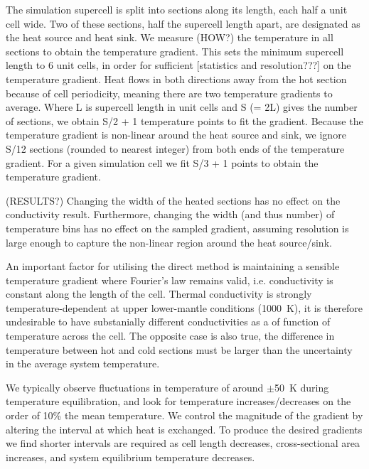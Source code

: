 \documentclass[%
preprint,                                  %
nofootinbib,
 amsmath,amssymb,
 aps,
]{revtex4-1}
\begin{document}
The simulation supercell is split into sections along its length, each half a unit cell wide. Two of these sections, half the supercell length apart, are designated as the heat source and heat sink. We measure (HOW?) the temperature in all sections to obtain the temperature gradient. This sets the minimum supercell length to 6 unit cells, in order for sufficient [statistics and resolution???] on the temperature gradient. Heat flows in both directions away from the hot section because of cell periodicity, meaning there are two temperature gradients to average. Where L is supercell length in unit cells and S (= 2L) gives the number of sections, we obtain S/2 + 1 temperature points to fit the gradient. Because the temperature gradient is non-linear around the heat source and sink, we ignore S/12 sections (rounded to nearest integer) from both ends of the temperature gradient. For a given simulation cell we fit S/3 + 1 points to obtain the temperature gradient.

(RESULTS?) Changing the width of the heated sections has no effect on the conductivity result. Furthermore, changing the width (and thus number) of temperature bins has no effect on the sampled gradient, assuming resolution is large enough to capture the non-linear region around the heat source/sink.

An important factor for utilising the direct method is maintaining a sensible temperature gradient where Fourier's law remains valid, i.e. conductivity is constant along the length of the cell. Thermal conductivity is strongly temperature-dependent at upper lower-mantle conditions (1000~K), it is therefore undesirable to have substanially different conductivities as a of function of temperature across the cell. The opposite case is also true, the difference in temperature between hot and cold sections must be larger than the uncertainty in the average system temperature. 

We typically observe fluctuations in temperature of around $\pm$50~K during temperature equilibration, and look for temperature increases/decreases on the order of 10\% the mean temperature. We control the magnitude of the gradient by altering the interval at which heat is exchanged. To produce the desired gradients we find shorter intervals are required as cell length decreases, cross-sectional area increases, and system equilibrium temperature decreases. 

\end{document}
